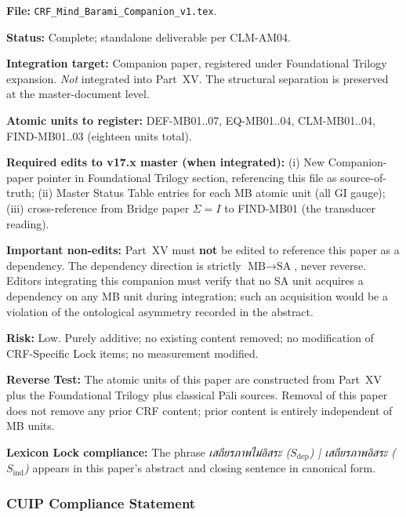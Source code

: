 \documentclass[12pt, a4paper]{article}
\begin{document}
\begin{formalbox}[title={Slot 4b: Mind $\otimes$ Barami Companion -- READY}]
\textbf{File:} \texttt{CRF\_Mind\_Barami\_Companion\_v1.tex}.

\textbf{Status:} Complete; standalone deliverable per CLM-AM04.

\textbf{Integration target:} Companion paper, registered under
Foundational Trilogy expansion. \emph{Not} integrated into Part~XV.
The structural separation is preserved at the master-document level.

\textbf{Atomic units to register:} DEF-MB01..07, EQ-MB01..04,
CLM-MB01..04, FIND-MB01..03 (eighteen units total).

\textbf{Required edits to v17.x master (when integrated):}
(i) New Companion-paper pointer in Foundational Trilogy section,
referencing this file as source-of-truth;
(ii) Master Status Table entries for each MB atomic unit (all GI gauge);
(iii) cross-reference from Bridge paper $\Sigma = I$ to FIND-MB01 (the
transducer reading).

\textbf{Important non-edits:} Part~XV must \textbf{not} be edited to
reference this paper as a dependency. The dependency direction is
strictly $\text{MB} \to \text{SA}$, never reverse. Editors integrating
this companion must verify that no SA unit acquires a dependency on
any MB unit during integration; such an acquisition would be a
violation of the ontological asymmetry recorded in the abstract.

\textbf{Risk:} Low. Purely additive; no existing content removed; no
modification of CRF-Specific Lock items; no measurement modified.

\textbf{Reverse Test:} The atomic units of this paper are constructed
from Part~XV plus the Foundational Trilogy plus classical Pāli
sources. Removal of this paper does not remove any prior CRF content;
prior content is entirely independent of MB units.

\textbf{Lexicon Lock compliance:} The phrase
\emph{เสถียรภาพไม่อิสระ ($S_{\mathrm{dep}}$) | เสถียรภาพอิสระ
($S_{\mathrm{ind}}$)} appears in this paper's abstract and closing
sentence in canonical form.
\end{formalbox}

\subsubsection{CUIP Compliance Statement}
\end{document}
